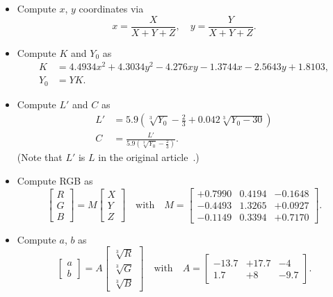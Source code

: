 \documentclass{scrartcl}
\theoremstyle{named}
\begin{document}
\begin{itemize}
  \item Compute $x$, $y$ coordinates via
    \[
      x = \frac{X}{X + Y + Z},\quad y = \frac{Y}{X + Y + Z}.
    \]
  \item Compute $K$ and $Y_0$ as
    \begin{equation}\label{eq:KY0}
      \begin{split}
        K &= 4.4934 x^2 + 4.3034 y^2 - 4.276 x y - 1.3744 x - 2.5643 y + 1.8103,\\
        Y_0 &= Y K.
      \end{split}
    \end{equation}

  \item Compute $L'$ and $C$ as
    \begin{align}
        \label{eq:lc}
        L' &= 5.9 \left(\sqrt[3]{Y_0} - \frac{2}{3} + 0.042 \sqrt[3]{Y_0 - 30}\right)\\
        \nonumber
        C &= \frac{L'}{5.9 \left(\sqrt[3]{Y_0} - \frac{2}{3}\right)}.
    \end{align}
    (Note that $L'$ is $L$ in the original article~\cite{macadam}.)

  \item Compute RGB as
    \begin{equation}\label{eq:m}
      \begin{bmatrix}
        R\\
        G\\
        B
      \end{bmatrix}
      =
      M
      \begin{bmatrix}
        X\\
        Y\\
        Z
      \end{bmatrix}
      \quad\text{with}\quad
      M=\begin{bmatrix}
        +0.7990 & 0.4194 & -0.1648\\
        -0.4493 & 1.3265 & +0.0927\\
        -0.1149 & 0.3394 & +0.7170
      \end{bmatrix}.
    \end{equation}

  \item Compute $a$, $b$ as
    \begin{equation}\label{eq:ab}
      \begin{bmatrix}
        a\\
        b
      \end{bmatrix}
      =
      A
      \begin{bmatrix}
        \sqrt[3]{R}\\
        \sqrt[3]{G}\\
        \sqrt[3]{B}
      \end{bmatrix}
      \quad\text{with}\quad
      A = \begin{bmatrix}
        -13.7 & +17.7 & -4\\
        1.7 & +8 & -9.7
      \end{bmatrix}.
    \end{equation}


\end{itemize}
\end{document}
